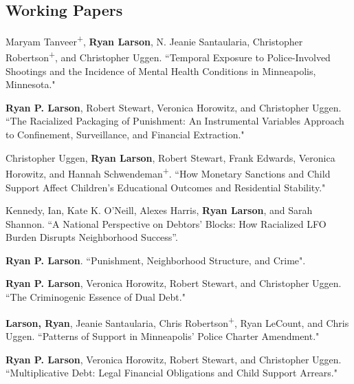 \documentclass[letterpaper]{article}
\newenvironment{publist}{%
  \begin{list}{}{%
    \setlength{\leftmargin}{0cm}   %
    \setlength{\labelwidth}{2cm}     %
    \setlength{\labelsep}{0.5cm}     %
  }%
}{%
  \end{list}%
}
\begin{document}
\subsection*{Working Papers}
\begin{publist}

\item Maryam Tanveer\textsuperscript{+}, \textbf{Ryan Larson}, N. Jeanie Santaularia, Christopher Robertson\textsuperscript{+}, and Christopher Uggen. ``Temporal Exposure to Police-Involved Shootings and the Incidence of Mental Health Conditions in Minneapolis, Minnesota." %

\item \textbf{Ryan P. Larson}, Robert Stewart, Veronica Horowitz, and Christopher Uggen. ``The Racialized Packaging of Punishment: An Instrumental Variables Approach to Confinement, Surveillance, and Financial Extraction."

\item Christopher Uggen, \textbf{Ryan Larson}, Robert Stewart, Frank Edwards, Veronica Horowitz, and Hannah Schwendeman\textsuperscript{+}. ``How Monetary Sanctions and Child Support Affect Children's Educational Outcomes and Residential Stability."

\item Kennedy, Ian, Kate K. O’Neill, Alexes Harris, \textbf{Ryan Larson}, and Sarah Shannon. “A National Perspective on Debtors’ Blocks: How Racialized LFO Burden Disrupts Neighborhood Success”.

\item \textbf{Ryan P. Larson}. ``Punishment, Neighborhood Structure, and Crime".


\item \textbf{Ryan P. Larson}, Veronica Horowitz, Robert Stewart, and Christopher Uggen. ``The Criminogenic Essence of Dual Debt."

\item \textbf{Larson, Ryan}, Jeanie Santaularia, Chris Robertson\textsuperscript{+}, Ryan LeCount, and Chris Uggen.  ``Patterns of Support in Minneapolis’ Police Charter Amendment." 

\item \textbf{Ryan P. Larson}, Veronica Horowitz, Robert Stewart, and Christopher Uggen. ``Multiplicative Debt: Legal Financial Obligations and Child Support Arrears."


\end{publist}
\end{document}
